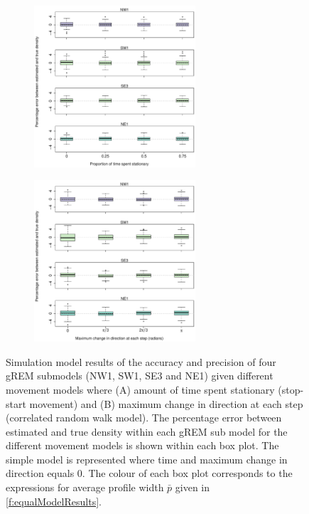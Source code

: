 \documentclass[a4paper,10pt,reqno,oneside]{amsart}
\begin{document}
\begin{figure}[t]
	\centering
	\begin{subfigure}[t]{60mm}
      		\centering
		\includegraphics[width=60mm]{imgs/ResultsPerch.pdf}
		\caption{} 
         	 \label{f:Perch}
	\end{subfigure}
	
	\begin{subfigure}[t]{60mm}
                \centering
		\includegraphics[width=60mm]{imgs/ResultsTort.pdf}
                \caption{} 
                \label{f:Tort}
         \end{subfigure}
	\label{f:BreakAssump}
	\caption{
	Simulation model results of the accuracy and precision of four gREM submodels (NW1, SW1, SE3 and NE1) given different movement models where (A) amount of time spent stationary (stop-start movement) and (B) maximum change in direction at each step (correlated random walk model). The percentage error between estimated and true density within each gREM sub model for the different movement models is shown within each box plot. The simple model is represented where time and maximum change in direction equals 0. The colour of each box plot corresponds to the expressions for average profile width $\bar{p}$ given in \ref{f:equalModelResults}.} 
\end{figure}

                  
                  
\end{document}

